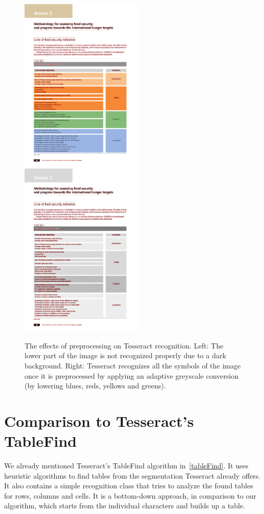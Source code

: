 \begin{figure}[t]
\centering

\includegraphics[width=16em]{img/results/im2_noPreproc.png}
\includegraphics[width=16em]{img/results/im2_Preproc.png}

\caption{The effects of preprocessing on Tesseract recognition. Left: The lower part of the image is not recognized properly due to a dark background. Right: Tesseract recognizes all the symbols of the image once it is preprocessed by applying an adaptive greyscale conversion (by lowering blues, reds, yellows and greens).}
\label{fig:preprocessEffectsAdapt}
\end{figure}

\section{Comparison to Tesseract's TableFind} \label{resultsTableFind}

We already mentioned Tesseract's TableFind algorithm in~\cref{tableFind}. It uses heuristic algorithms to find tables from the segmentation Tesseract already offers. It also contains a simple recognition class that tries to analyze the found tables for rows, columns and cells. It is a bottom-down approach, in comparison to our algorithm, which starts from the individual characters and builds up a table.

